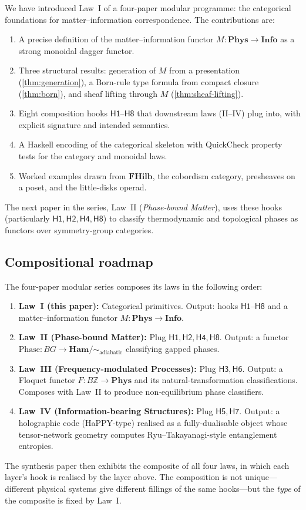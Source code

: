\documentclass[12pt]{article}
\theoremstyle{definition}
\theoremstyle{remark}
\newcommand{\Phys}{\mathbf{Phys}}
\newcommand{\Info}{\mathbf{Info}}
\newcommand{\FHilb}{\mathbf{FHilb}}
\begin{document}
We have introduced Law~I of a four-paper modular programme: the categorical foundations for matter--information correspondence. The contributions are:
\begin{enumerate}
\item A precise definition of the matter--information functor $M : \Phys \to \Info$ as a strong monoidal dagger functor.
\item Three structural results: generation of $M$ from a presentation (\cref{thm:generation}), a Born-rule type formula from compact closure (\cref{thm:born}), and sheaf lifting through $M$ (\cref{thm:sheaf-lifting}).
\item Eight composition hooks $\mathsf{H1}$--$\mathsf{H8}$ that downstream laws (II--IV) plug into, with explicit signature and intended semantics.
\item A Haskell encoding of the categorical skeleton with QuickCheck property tests for the category and monoidal laws.
\item Worked examples drawn from $\FHilb$, the cobordism category, presheaves on a poset, and the little-disks operad.
\end{enumerate}

The next paper in the series, Law~II (\emph{Phase-bound Matter}), uses these hooks (particularly $\mathsf{H1}, \mathsf{H2}, \mathsf{H4}, \mathsf{H8}$) to classify thermodynamic and topological phases as functors over symmetry-group categories.

\subsection{Compositional roadmap}

The four-paper modular series composes its laws in the following order:
\begin{enumerate}
\item \textbf{Law~I (this paper):} Categorical primitives. Output: hooks $\mathsf{H1}$--$\mathsf{H8}$ and a matter--information functor $M : \Phys \to \Info$.
\item \textbf{Law~II (Phase-bound Matter):} Plug $\mathsf{H1}, \mathsf{H2}, \mathsf{H4}, \mathsf{H8}$. Output: a functor $\mathrm{Phase} : B G \to \mathbf{Ham} / \!\sim_{\mathrm{adiabatic}}$ classifying gapped phases.
\item \textbf{Law~III (Frequency-modulated Processes):} Plug $\mathsf{H3}, \mathsf{H6}$. Output: a Floquet functor $F : B \mathbb{Z} \to \Phys$ and its natural-transformation classifications. Composes with Law~II to produce non-equilibrium phase classifiers.
\item \textbf{Law~IV (Information-bearing Structures):} Plug $\mathsf{H5}, \mathsf{H7}$. Output: a holographic code (HaPPY-type) realised as a fully-dualisable object whose tensor-network geometry computes Ryu--Takayanagi-style entanglement entropies.
\end{enumerate}
The synthesis paper then exhibits the composite of all four laws, in which each layer's hook is realised by the layer above. The composition is not unique---different physical systems give different fillings of the same hooks---but the \emph{type} of the composite is fixed by Law~I.
\end{document}
